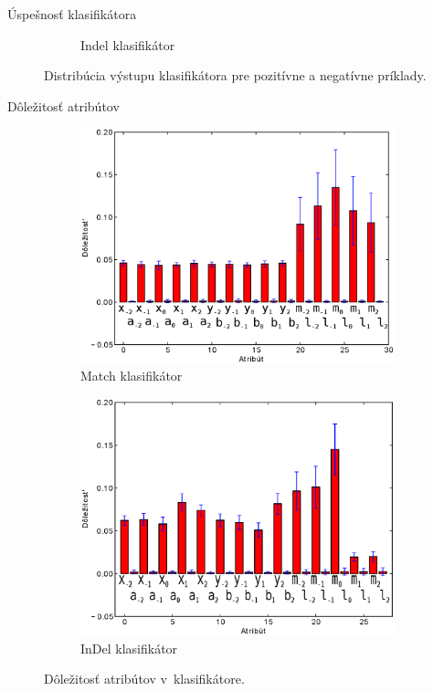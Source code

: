 \documentclass[xcolor=dvipsnames, compress, 12pt]{beamer}
\theoremstyle{definition}
\begin{document}
\begin{frame}{Úspešnosť klasifikátora}
\begin{figure}[h]
\begin{subfigure}[b]{0.45\textwidth}
                \caption{Indel klasifikátor}
        \end{subfigure}
        \caption{Distribúcia výstupu klasifikátora pre pozitívne a negatívne príklady.}
\end{figure}
\end{frame}


\begin{frame}{Dôležitosť atribútov}
\begin{figure}[h]
        \centering
        \begin{subfigure}[b]{0.45\textwidth}
                \includegraphics[width=\textwidth]{images/randomforest_combined_5_bars}
                \caption{Match klasifikátor}
        \end{subfigure}
        \qquad
        \begin{subfigure}[b]{0.45\textwidth}
                \includegraphics[width=\textwidth]{images/randomforest_combined_5_indel_bars}
                \caption{InDel klasifikátor}
        \end{subfigure}
        \caption{Dôležitosť atribútov v~klasifikátore.}
\end{figure}
\end{frame}
\end{document}
